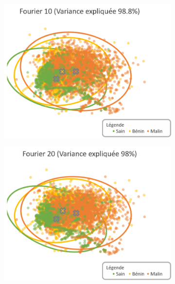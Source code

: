 \begin{figure}[p]
    \centering
    \begin{subfigure}{.49\textwidth}
      \includegraphics[width=\textwidth]{contents/chapter_5/resources/visualisation_frequency_Fourier10.png}
    \end{subfigure}
    \begin{subfigure}{.49\textwidth}
      \includegraphics[width=\textwidth]{contents/chapter_5/resources/visualisation_frequency_Fourier20.png}
    \end{subfigure}\vspace{10mm}
    

\end{figure}

